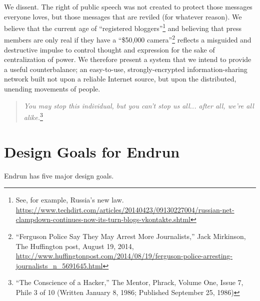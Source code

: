 \documentclass[12pt]{article}
\begin{document}
  We dissent. The right of public speech was not created to protect those messages everyone loves, but those messages that are reviled (for whatever reason). We believe that the current age of ``registered bloggers''\footnote{See, for example, Russia's new law. \url{https://www.techdirt.com/articles/20140423/09130227004/russian-net-clampdown-continues-now-its-turn-blogs-vkontakte.shtml}} and believing that press members are only real if they have a ``\$50,000 camera''\footnote{``Ferguson Police Say They May Arrest More Journalists,'' Jack Mirkinson, The Huffington post, August 19, 2014, \url{http://www.huffingtonpost.com/2014/08/19/ferguson-police-arresting-journalists_n_5691645.html}} reflects a misguided and destructive impulse to control thought and expression for the sake of centralization of power. We therefore present a system that we intend to provide a useful counterbalance; an easy-to-use, strongly-encrypted information-sharing network built not upon a reliable Internet source, but upon the distributed, unending movements of people. 
  
  \begin{quote}
    \emph{You may stop this individual, but you can't stop us all... after all, we're all alike.}\footnote{``The Conscience of a Hacker,'' The Mentor, Phrack, Volume One, Issue 7, Phile 3 of 10 (Written January 8, 1986; Published September 25, 1986)}
  \end{quote}
  
  \section{Design Goals for Endrun}
  
  Endrun has five major design goals.
  
\end{document}
